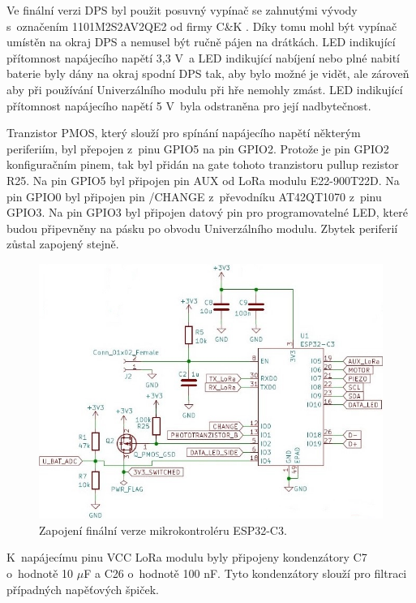 Ve finální verzi DPS byl použit posuvný vypínač se zahnutými vývody s~označením 1101M2S2AV2QE2 od firmy C\&K \cite{vypinac}.
Díky tomu mohl být vypínač umístěn na okraj DPS a nemusel být ručně pájen na drátkách. LED indikující přítomnost napájecího napětí 
3,3 V~a LED indikující nabíjení nebo plné nabití baterie byly dány na okraj spodní DPS tak, aby bylo možné je vidět, ale zároveň aby při používání Univerzálního modulu při hře nemohly zmást. LED indikující přítomnost 
napájecího napětí 5 V~byla odstraněna pro její nadbytečnost. 

Tranzistor PMOS, který slouží pro spínání napájecího napětí některým periferiím, byl přepojen z~pinu GPIO5 na pin GPIO2. Protože je pin GPIO2 konfiguračním pinem, tak byl přidán na gate tohoto tranzistoru pullup 
rezistor R25. Na pin GPIO5 byl připojen pin AUX od LoRa modulu E22-900T22D. Na pin GPIO0 byl připojen pin /CHANGE z~převodníku AT42QT1070 z~pinu GPIO3. Na pin GPIO3 byl připojen datový pin pro programovatelné LED, 
které budou připevněny na pásku po obvodu Univerzálního modulu. Zbytek periferií zůstal zapojený stejně. 

\begin{figure}[!h]
  \begin{center}
    \includegraphics[scale=0.75]{obrazky/ESP32-C3_final.jpg}
  \end{center}
  \caption[Zapojení finální verze mikrokontroléru ESP32-C3]{Zapojení finální verze mikrokontroléru ESP32-C3.}
\end{figure}

K~napájecímu pinu VCC LoRa modulu byly připojeny kondenzátory C7 o~hodnotě 10 $\mu$F a C26 o~hodnotě 100 nF. Tyto kondenzátory slouží pro filtraci případných napěťových špiček. 


